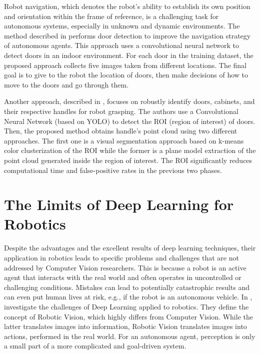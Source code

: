  Robot navigation, which denotes the robot's ability to establish its own position and orientation within the frame of reference, is a challenging task for autonomous systems, especially in unknown and dynamic environments. The method described in \cite{doorsandnavigation} performs door detection to improve the navigation strategy of autonomous agents. This approach uses a convolutional neural network to detect doors in an indoor environment. For each door in the training dataset, the proposed approach collects five images taken from different locations. The final goal is to give to the robot the location of doors, then make decisions of how to move to the doors and go through them.
 
 Another approach, described in \cite{doorcabinet}, focuses on robustly identify doors, cabinets, and their respective handles for robot grasping. The authors use a Convolutional Neural Network (based on YOLO) to detect the ROI (region of interest) of doors. Then, the proposed method obtains handle's point cloud using two different approaches. The first one is a visual segmentation approach based on k-means color clusterization of the ROI while the former is a plane model extraction of the point cloud generated inside the region of interest. The ROI significantly reduces computational time and false-positive rates in the previous two phases.
 
 \section{The Limits of Deep Learning for Robotics}
 
 Despite the advantages and the excellent results of deep learning techniques, their application in robotics leads to specific problems and challenges that are not addressed by Computer Vision researchers. This is because a robot is an active agent that interacts with the real world and often operates in uncontrolled or challenging conditions. Mistakes can lead to potentially catastrophic results and can even put human lives at risk, e.g., if the robot is an autonomous vehicle. In \cite{surveydeeplimits}, \citeauthor{surveydeeplimits} investigate the challenges of Deep Learning applied to robotics. They define the concept of Robotic Vision, which highly differs from Computer Vision. While the latter translates images into information, Robotic Vision translates images into actions, performed in the real world. For an autonomous agent, perception is only a small part of a more complicated and goal-driven system. 
 
